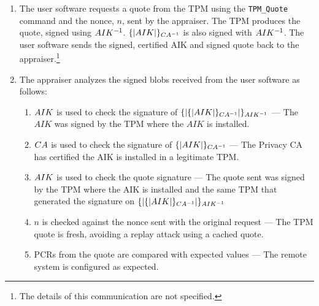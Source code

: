 \documentclass[10pt]{article}
\begin{document}
\begin{enumerate}
\item The user software requests a quote from the TPM using the
  \verb+TPM_Quote+ command and the nonce, $n$, sent by the appraiser.
  The TPM produces the quote, signed using $AIK^{-1}$.
  $\{|AIK|\}_{CA^{-1}}$ is also signed with $AIK^{-1}$.  The
  user software sends the signed, certified AIK and signed quote back
  to the appraiser.\footnote{The details of this communication are not
    specified.}

\item The appraiser analyzes the signed blobs received from the user
  software as follows: 
  
  \begin{enumerate}
  \item $AIK$ is used to check the signature of
    $\{|\{|AIK|\}_{CA^{-1}}|\}_{AIK^{-1}}$ --- The $AIK$ was signed by
    the TPM where the $AIK$ is installed.
    
  \item $CA$ is used to check the signature of
    $\{|AIK|\}_{CA^{-1}}$ --- The Privacy CA has certified the AIK
    is installed in a legitimate TPM.
  
  \item $AIK$ is used to check the quote signature --- The
    quote sent was signed by the TPM where the AIK is installed and
    the same TPM that generated the signature on
    $\{|\{|AIK|\}_{CA^{-1}}|\}_{AIK^{-1}}$
      
  \item $n$ is checked against the nonce sent with the original
    request --- The TPM quote is fresh, avoiding a replay attack using
    a cached quote.
    
  \item PCRs from the quote are compared with expected values --- The
    remote system is configured as expected.
  \end{enumerate}
\end{enumerate}
\end{document}
